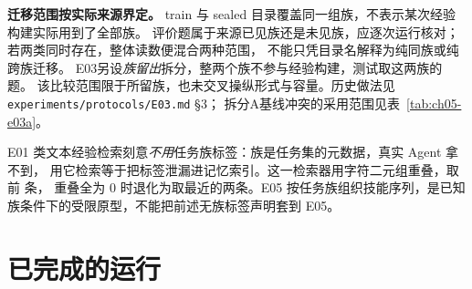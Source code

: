 \begin{principlebox}
\textbf{迁移范围按实际来源界定。}
train 与 sealed 目录覆盖同一组族，不表示某次经验构建实际用到了全部族。
评价题属于来源已见族还是未见族，应逐次运行核对；若两类同时存在，整体读数便混合两种范围，
不能只凭目录名解释为纯同族或纯跨族迁移。
E03另设\emph{族留出}拆分，整两个族不参与经验构建，测试取这两族的题。
该比较范围限于所留族，也未交叉操纵形式与容量。历史做法见 \texttt{experiments/protocols/E03.md} §3；
拆分A基线冲突的采用范围见表~\ref{tab:ch05-e03a}。
\end{principlebox}

E01 类文本经验检索刻意\emph{不用}任务族标签：族是任务集的元数据，真实 Agent 拿不到，
用它检索等于把标签泄漏进记忆索引。这一检索器用字符二元组重叠，取前  条，
重叠全为 0 时退化为取最近的两条。E05 按任务族组织技能序列，是已知族条件下的受限原型，不能把前述无族标签声明套到 E05。

\clearpage
\section{已完成的运行}
\label{sec:appb-runs}

